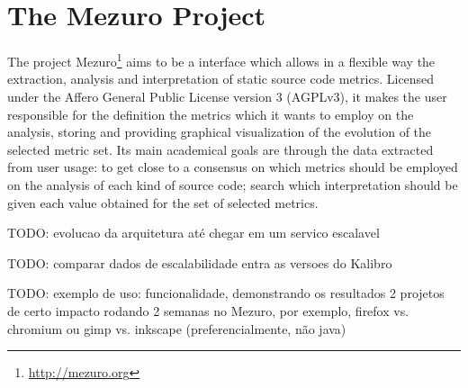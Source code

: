 \newpage
\section{The Mezuro Project}
\label{sec:mezuro}


The project Mezuro\footnote{\url{http://mezuro.org}} aims to be a interface which allows in a flexible way the extraction, analysis and interpretation of static source code metrics. Licensed under the Affero General Public License version 3 (AGPLv3), it makes the user responsible for the definition the metrics which it wants to employ on the analysis, storing and providing graphical visualization of the evolution of the selected metric set. Its main academical goals are through the data extracted from user usage: to get close to a consensus on which metrics should be employed on the analysis of each kind of source code; search which interpretation should be given each value obtained for the set of selected metrics.

TODO: evolucao da arquitetura até chegar em um servico escalavel

TODO: comparar dados de escalabilidade entra as versoes do Kalibro

TODO: exemplo de uso: funcionalidade, demonstrando os resultados 2 projetos de
certo impacto rodando 2 semanas no Mezuro, por exemplo, firefox vs.  chromium
ou gimp vs. inkscape (preferencialmente, não java)
